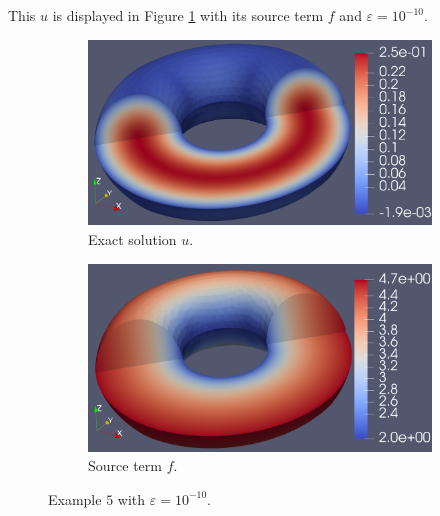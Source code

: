 \documentclass[12pt]{ociamthesis}
\begin{document}
This $u$ is displayed in Figure \ref{E5_uf} with its source term $f$ and $\varepsilon=10^{-10}$.
\begin{figure}[H]
 \begin{subfigure}{0.5\textwidth}
     \includegraphics[width=\textwidth]{Pics/uf/U_E5_eps_10.png}
     \caption{Exact solution $u$.}
 \end{subfigure}
   \begin{subfigure}{0.5\textwidth}
     \includegraphics[width=\textwidth]{Pics/uf/F_E5_eps_10.png}
     \caption{Source term $f$.}
 \end{subfigure}
 \caption{Example $5$ with $\varepsilon = 10^{-10}$.} \label{E5_uf}
\end{figure}
\end{document}
